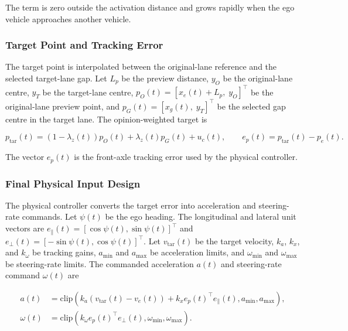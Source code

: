 The term is zero outside the activation distance and grows rapidly when the ego vehicle approaches another vehicle.

\subsubsection{Target Point and Tracking Error}

The target point is interpolated between the original-lane reference and the selected target-lane gap. Let \(L_p\) be the preview distance, \(y_O\) be the original-lane centre, \(y_T\) be the target-lane centre, \(p_O(t)=[x_e(t)+L_p,\;y_O]^\top\) be the original-lane preview point, and \(p_G(t)=[x_g(t),\;y_T]^\top\) be the selected gap centre in the target lane. The opinion-weighted target is

{\small
\begin{equation}
p_{\mathrm{tar}}(t)=(1-\lambda_z(t))p_O(t)+\lambda_z(t)p_G(t)+u_c(t),
\qquad
e_p(t)=p_{\mathrm{tar}}(t)-p_e(t).
\end{equation}
}

The vector \(e_p(t)\) is the front-axle tracking error used by the physical controller.

\subsubsection{Final Physical Input Design}

The physical controller converts the target error into acceleration and steering-rate commands. Let \(\psi(t)\) be the ego heading. The longitudinal and lateral unit vectors are \(e_\parallel(t)=[\cos\psi(t),\sin\psi(t)]^\top\) and \(e_\perp(t)=[-\sin\psi(t),\cos\psi(t)]^\top\). Let \(v_{\mathrm{tar}}(t)\) be the target velocity, \(k_a\), \(k_x\), and \(k_\omega\) be tracking gains, \(a_{\min}\) and \(a_{\max}\) be acceleration limits, and \(\omega_{\min}\) and \(\omega_{\max}\) be steering-rate limits. The commanded acceleration \(a(t)\) and steering-rate command \(\omega(t)\) are

{\small
\begin{equation}
\begin{aligned}
a(t)&=\mathrm{clip}\!\left(k_a(v_{\mathrm{tar}}(t)-v_e(t))+k_x e_p(t)^\top e_\parallel(t),a_{\min},a_{\max}\right),\\
\omega(t)&=\mathrm{clip}\!\left(k_\omega e_p(t)^\top e_\perp(t),\omega_{\min},\omega_{\max}\right).
\end{aligned}
\end{equation}
}

